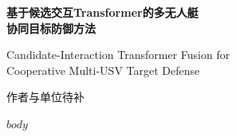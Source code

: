 \documentclass[UTF8,fontset=none,a4paper,10pt]{ctexart}
\begin{document}
\begin{center}
{\LARGE\bfseries 基于候选交互Transformer的多无人艇\\[3pt]协同目标防御方法\par}
\vspace{8pt}
{\large Candidate-Interaction Transformer Fusion for\\ Cooperative Multi-USV Target Defense\par}
\vspace{8pt}
{\normalsize 作者与单位\quad\textcolor{pending}{待补}\par}
\end{center}
$body$
\end{document}
